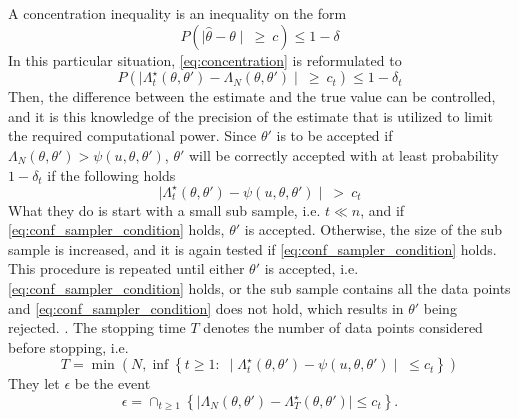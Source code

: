 \documentclass{article}
\theoremstyle{definition}
\begin{document}
A concentration inequality is an inequality on the form 
\begin{equation}\label{eq:concentration}
    P\left(\mid \hat{\theta} - \theta \mid \:\geq \:c\right) \leq 1 - \delta 
\end{equation}
In this particular situation, \eqref{eq:concentration} is reformulated to 
\begin{equation*}
    P\left(\mid\Lambda_t^{\star}\left(\theta, \theta'\right) - \Lambda_N\left(\theta, \theta'\right)\mid \: \geq \:c_t \right) \leq 1 - \delta_t  
\end{equation*}{}
Then, the difference between the estimate and the true value can be controlled, and it is this knowledge of the precision of the estimate that is utilized to limit the required computational power.
Since $\theta'$ is to be accepted if $\Lambda_N\left(\theta, \theta'\right) > \psi\left(u, \theta, \theta'\right)$,  $\theta'$ will be correctly accepted with at least probability $1 - \delta_t$ if  the following holds 
\begin{equation}\label{eq:conf_sampler_condition}
    \mid\Lambda_t^{\star}\left(\theta, \theta'\right) - \psi\left(u, \theta, \theta'\right)\mid \:>\: c_t
\end{equation} What they do is start with a small sub sample, i.e. $t \ll n$, and if \eqref{eq:conf_sampler_condition} holds, $\theta'$ is accepted. 
Otherwise, the size of the sub sample is increased, and it is again tested if \eqref{eq:conf_sampler_condition} holds.
This procedure is repeated until either $\theta'$ is accepted, i.e. \eqref{eq:conf_sampler_condition} holds, or the sub sample contains all the data points and \eqref{eq:conf_sampler_condition} does not hold, which results in $\theta'$ being rejected. . 
The stopping time $T$ denotes the number of data points considered before stopping, i.e. 
\begin{equation}\label{eq:T_stopping}
    T = \min\left(N, \inf\left\{t\geq 1 :\; \mid \Lambda_t^{\star}\left(\theta, \theta'\right) - \psi\left(u, \theta, \theta'\right)\mid \;\leq c_t\right\}\right)
\end{equation}
They let $\epsilon$ be the event
\begin{equation}\label{eq:epsilon}
    \mathbb{\epsilon} = \cap_{t\geq 1}\left\{\mid\Lambda_N\left(\theta, \theta'\right) - \Lambda_T^{\star} \left(\theta, \theta'\right) \mid \leq c_t\right\}.   
\end{equation}
\end{document}
